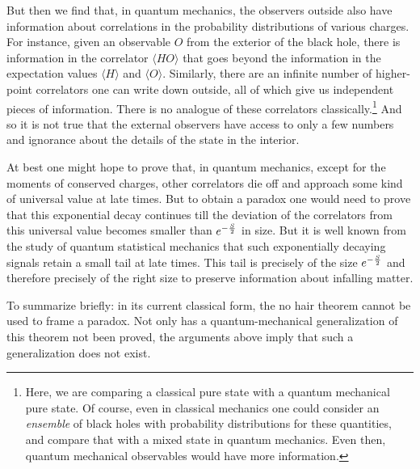 \documentclass[12pt]{article}
\begin{document}
\begin{enumerate}[label={\bf Q\arabic*}, series=qseries]
But then we find that, in quantum mechanics, the observers outside also have information about correlations in the probability distributions of various charges. For instance, given an observable $O$ from the exterior of the black hole, there is  information in  the correlator  $\langle H O \rangle$ that goes beyond the information in the expectation values $\langle H \rangle$ and $\langle O \rangle$. Similarly, there are an infinite number of higher-point correlators one can write down outside, all of which give us independent pieces of information. There is no analogue of these correlators classically.\footnote{Here, we are comparing a classical pure state with a quantum mechanical pure state. Of course, even in classical mechanics one could consider an {\em ensemble} of black holes with probability distributions for these quantities, and compare that with a mixed state in quantum mechanics. Even then, quantum mechanical observables would have more information.} And so it is not true that the external observers have access to only a few numbers and ignorance about the details of the state in the interior.

At best one might hope to prove that, in quantum mechanics, except for the moments of conserved charges, other correlators die off and approach some kind of universal value at late times. But to obtain a paradox one would need to prove that this exponential decay continues
till the deviation of the correlators from this universal value becomes smaller than $e^{-{S \over 2}}$ in size. But it is well known from the study of quantum statistical mechanics that such exponentially decaying signals retain a small tail at late times. This tail is precisely of the size $e^{-{S \over 2}}$ and therefore precisely of the right size to preserve information about infalling matter.

To summarize briefly: in its current classical form, the no hair theorem cannot be used to frame a paradox. Not only has a quantum-mechanical generalization of this theorem not been proved, the arguments above imply that such a generalization does not exist.

































\end{enumerate}
\end{document}

